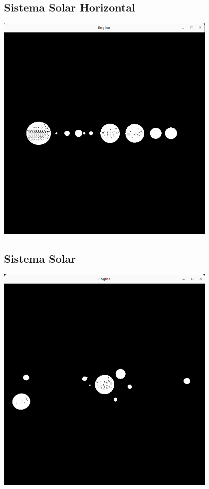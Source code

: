 \subsection{Sistema Solar Horizontal}

\begin{center}
    \includegraphics[width=0.8\textwidth]{imgs/sissolarhor.png}
    \label{fig:sissolarhor}
\end{center}

\subsection{Sistema Solar}

\begin{center}
    \includegraphics[width=0.8\textwidth]{imgs/sissolar.png}
    \label{fig:sissolar}
\end{center}